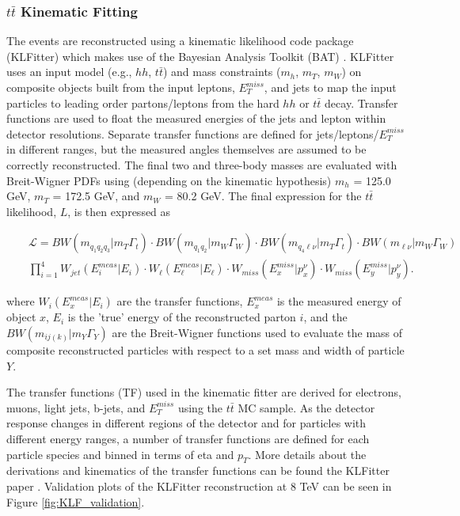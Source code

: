 \subsubsection{$t\bar{t}$ Kinematic Fitting} 
The events are reconstructed using a kinematic likelihood code package (KLFitter) \cite{klfitter} which makes use of the Bayesian Analysis Toolkit (BAT) \cite{Caldwell:2008fw}. KLFitter uses an input model (e.g., $hh$, $t\bar{t}$) and mass constraints ($m_{h}$, $m_{T}$, $m_{W}$) on composite objects built from the input leptons, $E_{T}^{miss}$, and jets to map the input particles to leading order partons/leptons from the hard $hh$ or $t\bar{t}$ decay. Transfer functions are used to float the measured energies of the jets and lepton within detector resolutions. Separate transfer functions are defined for jets/leptons/$E_{T}^{miss}$ in different \eta ranges, but the measured angles themselves are assumed to be correctly reconstructed. The final two and three-body masses are evaluated with Breit-Wigner PDFs using (depending on the kinematic hypothesis) $m_{h}$ = 125.0 GeV, $m_{T}$ = 172.5 GeV, and $m_{W}$ = 80.2 GeV. The final expression for the $t\bar{t}$ likelihood, ${L}$, is then expressed as 

\begin{eqnarray}
&& \mathcal{L}=BW(m_{q_1q_2q_3}| m_{T}\Gamma_{t})\cdot BW(m_{q_1q_2}| m_{W}\Gamma_{W})\cdot BW(m_{q_4\ell\nu}| m_{T}\Gamma_{t})\cdot BW(m_{\ell\nu} | m_{W}\Gamma_{W}) \nonumber \\
&& \prod\limits_{i=1}^4 W_{jet}(E_{i}^{meas}|E_{i})\cdot W_{\ell}(E_{\ell}^{meas}|E_{\ell})\cdot W_{miss}(E_{x}^{miss}|p_{x}^{\nu})\cdot W_{miss}(E_{y}^{miss}|p_{y}^{\nu}) .
\label{eq:KLF}
\end{eqnarray}

where $W_{i}(E_{x}^{meas}|E_{i})$ are the transfer functions, $E_{x}^{meas}$ is the measured energy of object $x$, $E_{i}$ is the 'true' energy of the reconstructed parton $i$, and the $BW(m_{ij(k)}| m_{Y}\Gamma_{Y})$ are the Breit-Wigner functions used to evaluate the mass of composite reconstructed particles with respect to a set mass and width of particle $Y$. 

The transfer functions (TF) used in the kinematic fitter are derived for electrons, muons, light jets, b-jets, and $E_{T}^{miss}$ using the $t\bar{t}$ MC sample. As the detector response changes in different regions of the detector and for particles with different energy ranges, a number of transfer functions are defined for each particle species and binned in terms of eta and $p_{T}$. More details about the derivations and kinematics of the transfer functions can be found the KLFitter paper \cite{klfitter}. Validation plots of the KLFitter reconstruction at 8 TeV can be seen in Figure \ref{fig:KLF_validation}.

